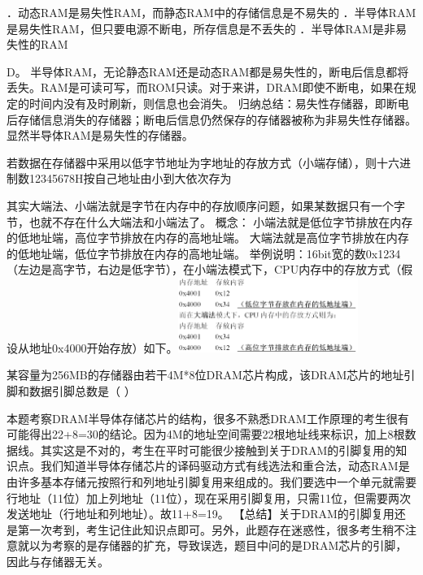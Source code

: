 ．动态RAM是易失性RAM，而静态RAM中的存储信息是不易失的
．半导体RAM是易失性RAM，但只要电源不断电，所存信息是不丢失的
．半导体RAM是非易失性的RAM
\par{}
\begin{solution}D。
半导体RAM，无论静态RAM还是动态RAM都是易失性的，断电后信息都将丢失。RAM是可读可写，而ROM只读。对于来讲，DRAM即使不断电，如果在规定的时间内没有及时刷新，则信息也会消失。
归纳总结：易失性存储器，即断电后存储信息消失的存储器；断电后信息仍然保存的存储器被称为非易失性存储器。显然半导体RAM是易失性的存储器。
\end{solution}
\question 若数据在存储器中采用以低字节地址为字地址的存放方式（小端存储），则十六进制数12345678H按自己地址由小到大依次存为
\par{}
\begin{solution}其实大端法、小端法就是字节在内存中的存放顺序问题，如果某数据只有一个字节，也就不存在什么大端法和小端法了。
概念：
小端法就是低位字节排放在内存的低地址端，高位字节排放在内存的高地址端。
大端法就是高位字节排放在内存的低地址端，低位字节排放在内存的高地址端。
举例说明：16bit宽的数0x1234（左边是高字节，右边是低字节），在小端法模式下，CPU内存中的存放方式（假设从地址0x4000开始存放）如下。\includegraphics[width=2.31250in,height=0.95833in]{computerassets/EF77748026784D6F780F5F685958E7B8.png}
\end{solution}
\question 某容量为256MB的存储器由若干4M*8位DRAM芯片构成，该DRAM芯片的地址引脚和数据引脚总数是（
）
\par{}
\begin{solution}本题考察DRAM半导体存储芯片的结构，很多不熟悉DRAM工作原理的考生很有可能得出22+8=30的结论。因为4M的地址空间需要22根地址线来标识，加上8根数据线。其实这是不对的，考生在平时可能很少接触到关于DRAM的引脚复用的知识点。我们知道半导体存储芯片的译码驱动方式有线选法和重合法，动态RAM是由许多基本存储元按照行和列地址引脚复用来组成的。我们要选中一个单元就需要行地址（11位）加上列地址（11位），现在采用引脚复用，只需11位，但需要两次发送地址（行地址和列地址）。故11+8=19。
【总结】关于DRAM的引脚复用还是第一次考到，考生记住此知识点即可。另外，此题存在迷惑性，很多考生稍不注意就以为考察的是存储器的扩充，导致误选，题目中问的是DRAM芯片的引脚，因此与存储器无关。
\end{solution}
